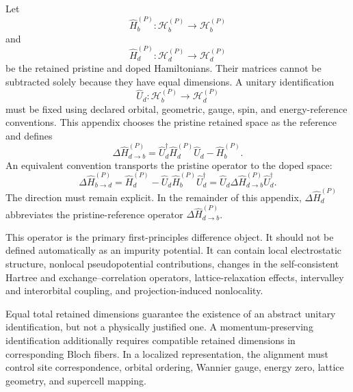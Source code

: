 Let
\begin{equation}
    \hat H_b^{(P)}:
    \mathcal H_b^{(P)}
    \longrightarrow
    \mathcal H_b^{(P)}
\end{equation}
and
\begin{equation}
    \hat H_d^{(P)}:
    \mathcal H_d^{(P)}
    \longrightarrow
    \mathcal H_d^{(P)}
\end{equation}
be the retained pristine and doped Hamiltonians. Their matrices cannot be
subtracted solely because they have equal dimensions. A unitary identification
\begin{equation}
    \hat U_d:
    \mathcal H_b^{(P)}
    \longrightarrow
    \mathcal H_d^{(P)}
\end{equation}
must be fixed using declared orbital, geometric, gauge, spin, and
energy-reference conventions. This appendix chooses the pristine retained space as the reference and defines
\begin{equation}
    \Delta\hat H_{d\rightarrow b}^{(P)}
    =
    \hat U_d^\dagger
    \hat H_d^{(P)}
    \hat U_d
    -
    \hat H_b^{(P)}.
\end{equation}
An equivalent convention transports the pristine operator to the doped space:
\begin{equation}
    \Delta\hat H_{b\rightarrow d}^{(P)}
    =
    \hat H_d^{(P)}
    -
    \hat U_d
    \hat H_b^{(P)}
    \hat U_d^\dagger
    =
    \hat U_d
    \Delta\hat H_{d\rightarrow b}^{(P)}
    \hat U_d^\dagger.
\end{equation}
The direction must remain explicit. In the remainder of this appendix,
$\Delta\hat H_d^{(P)}$ abbreviates the pristine-reference operator
$\Delta\hat H_{d\rightarrow b}^{(P)}$.

This operator is the primary first-principles difference object. It should not
be defined automatically as an impurity potential. It can contain local
electrostatic structure, nonlocal pseudopotential contributions, changes in the
self-consistent Hartree and exchange--correlation operators,
lattice-relaxation effects, intervalley and interorbital coupling, and
projection-induced nonlocality.

Equal total retained dimensions guarantee the existence of an abstract unitary
identification, but not a physically justified one. A momentum-preserving
identification additionally requires compatible retained dimensions in
corresponding Bloch fibers. In a localized representation, the alignment must
control site correspondence, orbital ordering, Wannier gauge, energy zero,
lattice geometry, and supercell mapping.

